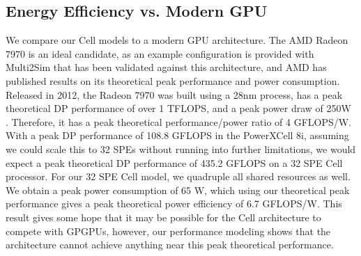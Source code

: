 \documentclass{sig-alternate-05-2015}
\begin{document}
\subsection{Energy Efficiency vs. Modern GPU}

We compare our Cell models to a modern GPU architecture. The AMD Radeon 7970 is an ideal candidate, as an example configuration is provided with Multi2Sim that has been validated against this architecture, and AMD has published results on its theoretical peak performance and power consumption. Released in 2012, the Radeon 7970 was built using a 28nm process, has a peak theoretical DP performance of over 1 TFLOPS, and a peak power draw of 250W \cite{radeon7970}. Therefore, it has a peak theoretical performance/power ratio of 4 GFLOPS/W. With a peak DP performance of 108.8 GFLOPS in the PowerXCell 8i, assuming we could scale this to 32 SPEs without running into further limitations, we would expect a peak theoretical DP performance of 435.2 GFLOPS on a 32 SPE Cell processor. For our 32 SPE Cell model, we quadruple all shared resources as well. We obtain a peak power consumption of 65 W, which using our theoretical peak performance gives a peak theoretical power efficiency of 6.7 GFLOPS/W. This result gives some hope that it may be possible for the Cell architecture to compete with GPGPUs, however, our performance modeling shows that the architecture cannot achieve anything near this peak theoretical performance.
\end{document}
